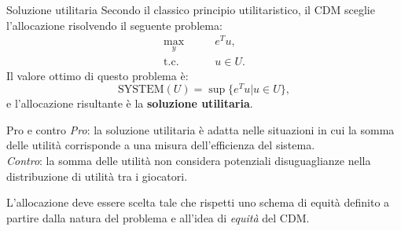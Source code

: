 \documentclass{beamer}
\begin{document}
	\begin{frame}{Soluzione utilitaria}
		Secondo il classico principio utilitaristico, il CDM sceglie l'allocazione risolvendo il seguente problema:
		\begin{equation}
			\begin{split}
				\underset{y}{\text{max}} & \qquad e^T u, \\
				\text{t.c.} & \qquad u \in U.
			\end{split}
		\end{equation}
		Il valore ottimo di questo problema è:
		\begin{equation}
			\text{SYSTEM}(U) = \sup \{e^T u | u \in U\},
		\end{equation}
		e l'allocazione risultante è la \textbf{soluzione utilitaria}.
	\end{frame}
	
	\begin{frame}
		\begin{block}{Pro e contro}
			\textit{Pro}: la soluzione utilitaria è adatta nelle situazioni in cui la somma delle utilità corrisponde a una misura dell'efficienza del sistema.\\
			\textit{Contro}: la somma delle utilità non considera potenziali disuguaglianze nella distribuzione di utilità tra i giocatori.
		\end{block}
		L'allocazione deve essere scelta tale che rispetti uno schema di equità definito a partire dalla natura del problema e all'idea di \textit{equità} del CDM.
	\end{frame}
	
\end{document}
